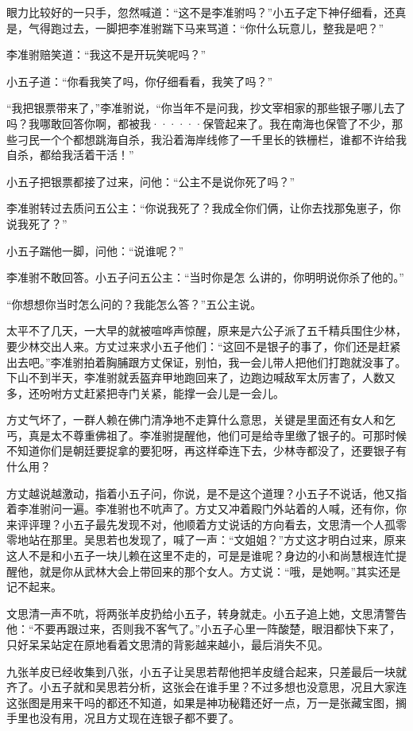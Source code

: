 眼力比较好的一只手，忽然喊道：“这不是李准驸吗？”小五子定下神仔细看，还真是，气得跑过去，一脚把李准驸踹下马来骂道：“你什么玩意儿，整我是吧？”

李准驸赔笑道：“我这不是开玩笑呢吗？”

小五子道：“你看我笑了吗，你仔细看看，我笑了吗？”

“我把银票带来了，”李准驸说，“你当年不是问我，抄文宰相家的那些银子哪儿去了吗？我哪敢回答你啊，都被我······保管起来了。我在南海也保管了不少，那些刁民一个个都想跳海自杀，我沿着海岸线修了一千里长的铁栅栏，谁都不许给我自杀，都给我活着干活！”

小五子把银票都接了过来，问他：“公主不是说你死了吗？”

李准驸转过去质问五公主：“你说我死了？我成全你们俩，让你去找那兔崽子，你说我死了？”

小五子踹他一脚，问他：“说谁呢？”

李准驸不敢回答。小五子问五公主：“当时你是怎
么讲的，你明明说你杀了他的。”

“你想想你当时怎么问的？我能怎么答？”五公主说。
\newline

太平不了几天，一大早的就被喧哗声惊醒，原来是六公子派了五千精兵围住少林，要少林交出人来。方丈过来求小五子他们：“这回不是银子的事了，你们还是赶紧出去吧。”李准驸拍着胸脯跟方丈保证，别怕，我一会儿带人把他们打跑就没事了。下山不到半天，李准驸就丢盔弃甲地跑回来了，边跑边喊敌军太厉害了，人数又多，还吩咐方丈赶紧把寺门关紧，能撑一会儿是一会儿。

方丈气坏了，一群人赖在佛门清净地不走算什么意思，关键是里面还有女人和乞丐，真是太不尊重佛祖了。李准驸提醒他，他们可是给寺里缴了银子的。可那时候不知道你们是朝廷要捉拿的要犯呀，再这样牵连下去，少林寺都没了，还要银子有什么用？

方丈越说越激动，指着小五子问，你说，是不是这个道理？小五子不说话，他又指着李准驸问一遍。李准驸也不吭声了。方丈又冲着殿门外站着的人喊，还有你，你来评评理？小五子最先发现不对，他顺着方丈说话的方向看去，文思清一个人孤零零地站在那里。吴思若也发现了，喊了一声：“文姐姐？”方丈这才明白过来，原来这人不是和小五子一块儿赖在这里不走的，可是是谁呢？身边的小和尚慧根连忙提醒他，就是你从武林大会上带回来的那个女人。方丈说：“哦，是她啊。”其实还是记不起来。

文思清一声不吭，将两张羊皮扔给小五子，转身就走。小五子追上她，文思清警告他：“不要再跟过来，否则我不客气了。”小五子心里一阵酸楚，眼泪都快下来了，只好呆呆站定在原地看着文思清的背影越来越小，最后消失不见。

九张羊皮已经收集到八张，小五子让吴思若帮他把羊皮缝合起来，只差最后一块就齐了。小五子就和吴思若分析，这张会在谁手里？不过多想也没意思，况且大家连这张图是用来干吗的都还不知道，如果是神功秘籍还好一点，万一是张藏宝图，搁手里也没有用，况且方丈现在连银子都不要了。

